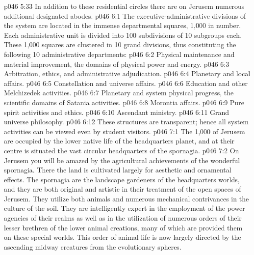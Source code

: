 \vs p046 5:33 \pc {} In addition to these residential circles there are on Jerusem numerous additional designated abodes.
\vs p046 6:1 The executive\hyp{}administrative divisions of the system are located in the immense departmental squares, 1,000 in number. Each administrative unit is divided into 100 subdivisions of 10 subgroups each. These 1,000 squares are clustered in 10 grand divisions, thus constituting the following 10 administrative departments:
\vs p046 6:2 \bibnobreakspace Physical maintenance and material improvement, the domains of physical power and energy.
\vs p046 6:3 \bibnobreakspace Arbitration, ethics, and administrative adjudication.
\vs p046 6:4 \bibnobreakspace Planetary and local affairs.
\vs p046 6:5 \bibnobreakspace Constellation and universe affairs.
\vs p046 6:6 \bibnobreakspace Education and other Melchizedek activities.
\vs p046 6:7 \bibnobreakspace Planetary and system physical progress, the scientific domains of Satania activities.
\vs p046 6:8 \bibnobreakspace Morontia affairs.
\vs p046 6:9 \bibnobreakspace Pure spirit activities and ethics.
\vs p046 6:10 \bibnobreakspace Ascendant ministry.
\vs p046 6:11 \bibnobreakspace Grand universe philosophy.
\vs p046 6:12 \pc These structures are transparent; hence all system activities can be viewed even by student visitors.
\vs p046 7:1 The 1,000  of Jerusem are occupied by the lower native life of the headquarters planet, and at their centre is situated the vast circular headquarters of the spornagia.
\vs p046 7:2 On Jerusem you will be amazed by the agricultural achievements of the wonderful spornagia. There the land is cultivated largely for aesthetic and ornamental effects. The spornagia are the landscape gardeners of the headquarters worlds, and they are both original and artistic in their treatment of the open spaces of Jerusem. They utilize both animals and numerous mechanical contrivances in the culture of the soil. They are intelligently expert in the employment of the power agencies of their realms as well as in the utilization of numerous orders of their lesser brethren of the lower animal creations, many of which are provided them on these special worlds. This order of animal life is now largely directed by the ascending midway creatures from the evolutionary spheres.
